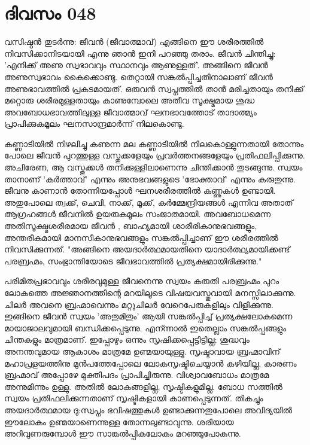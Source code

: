  
\section{ദിവസം 048}


വസിഷ്ഠന്‍ തുടര്‍ന്നു: ജീവന്‍ (ജീവാത്മാവ്‌) എങ്ങിനെ ഈ ശരീരത്തില്‍ നിവസിക്കാനിടയായി എന്നു ഞാന്‍ ഇനി പറഞ്ഞു തരാം. ജീവന്‍ ചിന്തിച്ചു: 'എനിക്ക്‌ അണു സ്വഭാവവും സ്ഥാനവും ആണുള്ളത്‌'. അങ്ങിനെ ജീവന്‍ അണുസ്വഭാവം കൈക്കൊണ്ടു. തെറ്റായി സങ്കല്‍പ്പിച്ചതിനാലാണ്‌ ജീവന്‍ അണുഭാവത്തില്‍ പ്രകടമായത്‌. ഒരുവന്‍ സ്വപ്നത്തില്‍ താന്‍ മരിച്ചതായും തനിക്ക്‌ മറ്റൊരു ശരീരമുള്ളതായും കാണുമ്പോലെ അതീവ സൂക്ഷ്മമായ ശുദ്ധ അവബോധഭാവത്തിലുള്ള ജീവാത്മാവ്‌ ഘനഭാവത്തോട്‌ താദാത്മ്യം പ്രാപിക്കുകമൂലം ഘനസാന്ദ്രമാര്‍ന്ന് നിലകൊണ്ടു.

കണ്ണാടിയില്‍ നിഴലിച്ചു കണുന്ന മല കണ്ണാടിയില്‍ നിലകൊള്ളുന്നതായി തോന്നും പോലെ ജീവന്‍ പുറത്തുള്ള വസ്തുക്കളേയും പ്രവര്‍ത്തനങ്ങളേയും പ്രതിഫലിപ്പിക്കുന്നു. അചിരേണ, ആ വസ്തുക്കള്‍ തനിക്കുള്ളിലാണെന്നു ചിന്തിക്കാന്‍ തുടങ്ങുന്നു. സ്വയം താനാണ്‌ 'കര്‍ത്താവ്‌' എന്നും അനുഭവങ്ങളുടെ 'ഭോക്താവ്‌' എന്നും കരുതുന്നു. ജീവനു കാണാന്‍ തോന്നിയപ്പോള്‍ ഘനശരീരത്തില്‍ കണ്ണുകള്‍ ഉണ്ടായി. അതുപോലെ ത്വക്ക്‌, ചെവി, നാക്ക്‌, മൂക്ക്‌, കര്‍മ്മേന്ദ്രിയങ്ങള്‍ എന്നിവ അതാത്‌ ആഗ്രഹങ്ങള്‍ ജീവനില്‍ ഉയരുകമൂലം സംജാതമായി. അവബോധമെന്ന അതിസൂക്ഷ്മശരീരമായ ജീവന്‍ , ബാഹ്യമായി ശാരീരികാനുഭവങ്ങളും, അന്തരീകമായി മാനസീകാനുഭവങ്ങളും സങ്കല്‍പ്പിച്ചാണ്‌ ഈ ശരീരത്തില്‍ നിവസിക്കുന്നത്‌. "അങ്ങിനെ അയദാര്‍ത്ഥമായതിനെ യാദാര്‍ത്ഥ്യമായിക്കണ്ട്‌ പരബ്രഹ്മം, സംഭ്രാന്തിയോടെ ജീവഭാവത്തില്‍ പ്രത്യക്ഷമായിരിക്കുന്നു."

പരിമിതപ്രഭാവവും ശരീരവുമുള്ള ജീവനെന്നു സ്വയം കരുതി പരബ്രഹ്മം പുറം ലോകത്തെ അജ്ഞാനത്തിന്റെ മറയിലൂടെ വിഷയവസ്തുവായി മനസ്സിലാക്കുന്നു. ചിലര്‍ അവനെ ബ്രഹ്മാവെന്നും മറ്റുചിലര്‍ വേറെപേരുകളിലും വിളിക്കുന്നു. ഇങ്ങിനെ ജീവന്‍ സ്വയം 'അതുമിതും' ആയി സങ്കല്‍പ്പിച്ച്‌ പ്രത്യക്ഷലോകമെന്ന മായാജാലവുമായി ബന്ധിക്കപ്പെടുന്നു. എന്ന്നാല്‍ ഇതെല്ലാം സങ്കല്‍പ്പങ്ങളും ചിന്തകളും മാത്രമാണ്‌. ഇപ്പോഴും ഒന്നും സൃഷിക്കപ്പെട്ടിട്ടില്ല; ശുദ്ധവും അനന്തവുമായ ആകാശം മാത്രമേ ഉണ്മയായുള്ളു. സൃഷ്ടാവായ ബ്രഹ്മാവിന്‌ മഹാപ്രളയത്തിനു മുന്‍പത്തേപ്പോലെ ലോകസൃഷ്ടിചെയ്യാന്‍ കഴിയില്ല, കാരണം ബ്രഹ്മാവ്‌ അപ്പോഴേ മുക്തിപദം പ്രാപിച്ചിരുന്നു. വിശ്വാവബോധം മാത്രമേ അന്നുമിന്നും ഉള്ളു. അതില്‍ ലോകങ്ങളില്ല, സൃഷ്ടികളുമില്ല. ബോധ സത്തിൽ സ്വയം പ്രതിഫലിക്കുന്നതാണ്‌ സൃഷ്ടികളായി കാണപ്പെടുന്നത്‌. തികച്ചും അയദാര്‍ത്ഥമായ ദു:സ്വപ്നം ഭവിഷത്തുകള്‍ ഉണ്ടാക്കുന്നതുപോലെ അവിദ്യയില്‍ ഈലോകം ഉണ്മയാണെന്നുള്ള തോന്നലുണ്ടാവുന്നു. ശരിയായ അറിവുണരുമ്പോള്‍ ഈ സാങ്കല്‍പ്പികലോകം മറഞ്ഞുപോകുന്നു. 
